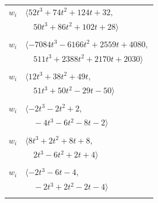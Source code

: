 \documentclass[11pt]{article}
\begin{document}
\begin{longtable}{@{}ll@{}}
$w_i$ & $\langle 52t^{3}+74t^{2}+124t+32,$\\
 & $\quad 50t^{3}+86t^{2}+102t+28\rangle$\\
\addlinespace[2pt]
\multicolumn{2}{@{}p{0.97\textwidth}@{}}{$i=56$, $D_i=608$, $\rho_{ij}$: $10{:}2, \allowbreak 17{:}1, \allowbreak 29{:}1, \allowbreak 33{:}1, \allowbreak 34{:}2, \allowbreak 39{:}2, \allowbreak 43{:}2, \allowbreak 47{:}2, \allowbreak 48{:}1, \allowbreak 58{:}1, \allowbreak 59{:}2, \allowbreak 61{:}2, \allowbreak 62{:}1$}\\
$w_i$ & $\langle -7084t^{3}-6166t^{2}+2559t+4080,$\\
 & $\quad 511t^{3}+2388t^{2}+2170t+2030\rangle$\\
\addlinespace[2pt]
\multicolumn{2}{@{}p{0.97\textwidth}@{}}{$i=57$, $D_i=4$, $\rho_{ij}$: $24{:}1, \allowbreak 29{:}1, \allowbreak 33{:}1, \allowbreak 34{:}2, \allowbreak 36{:}2, \allowbreak 44{:}2, \allowbreak 53{:}1, \allowbreak 60{:}1, \allowbreak 61{:}2, \allowbreak 62{:}1$}\\
$w_i$ & $\langle 12t^{3}+38t^{2}+49t,$\\
 & $\quad 51t^{3}+50t^{2}-29t-50\rangle$\\
\addlinespace[2pt]
\multicolumn{2}{@{}p{0.97\textwidth}@{}}{$i=58$, $D_i=2$, $\rho_{ij}$: $3{:}1, \allowbreak 9{:}2, \allowbreak 18{:}1, \allowbreak 47{:}1, \allowbreak 56{:}2$}\\
$w_i$ & $\langle -2t^{3}-2t^{2}+2,$\\
 & $\quad -4t^{3}-6t^{2}-8t-2\rangle$\\
\addlinespace[2pt]
\multicolumn{2}{@{}p{0.97\textwidth}@{}}{$i=59$, $D_i=4$, $\rho_{ij}$: $10{:}1, \allowbreak 11{:}1, \allowbreak 29{:}2, \allowbreak 33{:}1, \allowbreak 41{:}2, \allowbreak 56{:}1$}\\
$w_i$ & $\langle 8t^{3}+2t^{2}+8t+8,$\\
 & $\quad 2t^{3}-6t^{2}+2t+4\rangle$\\
\addlinespace[2pt]
\multicolumn{2}{@{}p{0.97\textwidth}@{}}{$i=60$, $D_i=2$, $\rho_{ij}$: $1{:}1, \allowbreak 29{:}2, \allowbreak 33{:}2, \allowbreak 57{:}2$}\\
$w_i$ & $\langle -2t^{3}-6t-4,$\\
 & $\quad -2t^{3}+2t^{2}-2t-4\rangle$\\
\addlinespace[2pt]
\multicolumn{2}{@{}p{0.97\textwidth}@{}}{$i=61$, $D_i=8$, $\rho_{ij}$: $7{:}1, \allowbreak 13{:}2, \allowbreak 18{:}2, \allowbreak 29{:}2, \allowbreak 41{:}2, \allowbreak 42{:}2, \allowbreak 56{:}1, \allowbreak 57{:}1, \allowbreak 62{:}2$}\\

\end{longtable}
\end{document}
